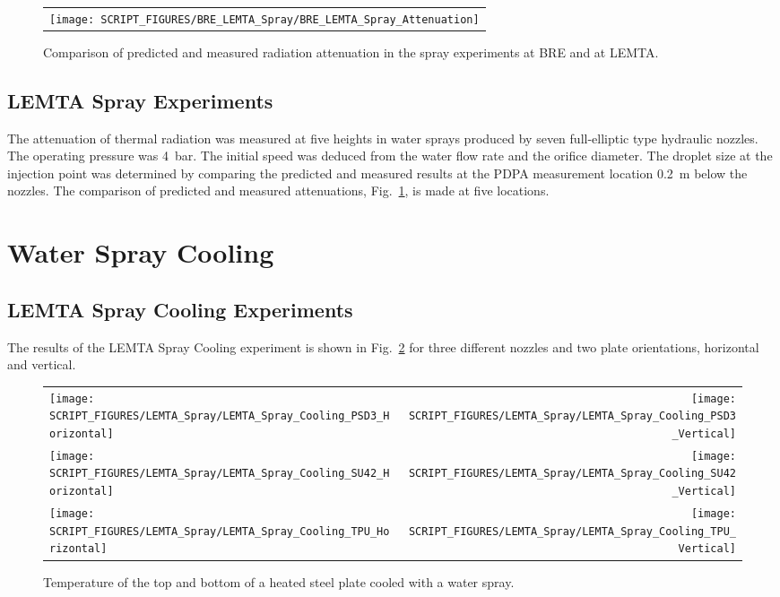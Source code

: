 \begin{figure}[h!]
\begin{center}
\begin{tabular}{c}
\texttt{[image: SCRIPT\_FIGURES/BRE\_LEMTA\_Spray/BRE\_LEMTA\_Spray\_Attenuation]}
\end{tabular}
\end{center}
\caption[Comparison of radiation attenuation, BRE and LEMTA Spray experiments]{Comparison of predicted and measured radiation attenuation in the spray experiments at BRE and at LEMTA.}
\label{BRE_LEMTA_Spray_Attenuation}
\end{figure}


\subsection{LEMTA Spray Experiments}

The attenuation of thermal radiation was measured at five heights in water sprays produced by seven full-elliptic type hydraulic nozzles. The operating pressure was 4~bar. The initial speed was deduced from the water flow rate and the orifice diameter. The droplet size at the injection point was determined by comparing the predicted and measured results at the PDPA measurement location 0.2~m below the nozzles. The comparison of predicted and measured attenuations, Fig.~\ref{BRE_LEMTA_Spray_Attenuation}, is made at five locations.


\clearpage

\section{Water Spray Cooling}

\subsection{LEMTA Spray Cooling Experiments}

The results of the LEMTA Spray Cooling experiment is shown in Fig.~\ref{LEMTA_Spray_Cooling_Fig} for three different nozzles and two plate orientations, horizontal and vertical.

\begin{figure}[h!]
\begin{tabular*}{\textwidth}{l@{\extracolsep{\fill}}r}
\texttt{[image: SCRIPT\_FIGURES/LEMTA\_Spray/LEMTA\_Spray\_Cooling\_PSD3\_Horizontal]} &
\texttt{[image: SCRIPT\_FIGURES/LEMTA\_Spray/LEMTA\_Spray\_Cooling\_PSD3\_Vertical]} \\
\texttt{[image: SCRIPT\_FIGURES/LEMTA\_Spray/LEMTA\_Spray\_Cooling\_SU42\_Horizontal]} &
\texttt{[image: SCRIPT\_FIGURES/LEMTA\_Spray/LEMTA\_Spray\_Cooling\_SU42\_Vertical]} \\
\texttt{[image: SCRIPT\_FIGURES/LEMTA\_Spray/LEMTA\_Spray\_Cooling\_TPU\_Horizontal]} &
\texttt{[image: SCRIPT\_FIGURES/LEMTA\_Spray/LEMTA\_Spray\_Cooling\_TPU\_Vertical]}
\end{tabular*}
\caption[LEMTA Spray Cooling steel plate temperatures]{Temperature of the top and bottom of a heated steel plate cooled with a water spray.}
\label{LEMTA_Spray_Cooling_Fig}
\end{figure}


